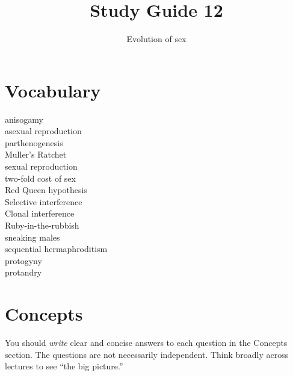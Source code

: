 \documentclass[letterpaper]{tufte-handout}
\title{Study Guide 12\hfill}
\author{Evolution of sex}
\date{} %
\begin{document}
\maketitle	%

\section{Vocabulary}

\begin{multicols}{2}
anisogamy \\
asexual reproduction\\
parthenogenesis \\
Muller's Ratchet \\
sexual reproduction\\
two-fold cost of sex\\
Red Queen hypothesis \\
Selective interference \\
Clonal interference \\
Ruby-in-the-rubbish \\
sneaking males\\
sequential hermaphroditism\\
protogyny\\
protandry\\

\end{multicols}


\section{Concepts}

You should \emph{write} clear and concise answers to each question in the Concepts section.  The questions are not necessarily independent.  Think broadly across lectures to see ``the big picture.'' 
\end{document}
